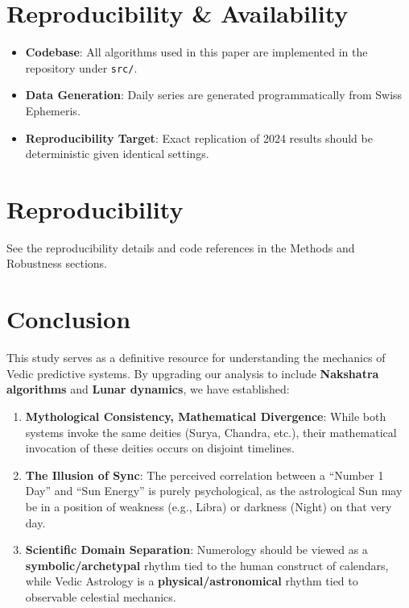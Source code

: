 \documentclass[
  american,
  11pt,
  oneside,
  openany]{article}
\providecommand{\tightlist}{%
  \setlength{\itemsep}{0pt}\setlength{\parskip}{0pt}}
\begin{document}
\section{Reproducibility \&
Availability}\label{reproducibility-availability}

\begin{itemize}
\tightlist
\item
  \textbf{Codebase}: All algorithms used in this paper are implemented
  in the repository under \texttt{src/}.
\item
  \textbf{Data Generation}: Daily series are generated programmatically
  from Swiss Ephemeris.
\item
  \textbf{Reproducibility Target}: Exact replication of 2024 results
  should be deterministic given identical settings.
\end{itemize}

\FloatBarrier

\section{Reproducibility}\label{reproducibility}

See the reproducibility details and code references in the Methods and
Robustness sections.

\section{Conclusion}\label{conclusion}

This study serves as a definitive resource for understanding the
mechanics of Vedic predictive systems. By upgrading our analysis to
include \textbf{Nakshatra algorithms} and \textbf{Lunar dynamics}, we
have established:

\begin{enumerate}
\def\labelenumi{\arabic{enumi}.}
\tightlist
\item
  \textbf{Mythological Consistency, Mathematical Divergence}: While both
  systems invoke the same deities (Surya, Chandra, etc.), their
  mathematical invocation of these deities occurs on disjoint timelines.
\item
  \textbf{The Illusion of Sync}: The perceived correlation between a
  ``Number 1 Day'' and ``Sun Energy'' is purely psychological, as the
  astrological Sun may be in a position of weakness (e.g., Libra) or
  darkness (Night) on that very day.
\item
  \textbf{Scientific Domain Separation}: Numerology should be viewed as
  a \textbf{symbolic/archetypal} rhythm tied to the human construct of
  calendars, while Vedic Astrology is a \textbf{physical/astronomical}
  rhythm tied to observable celestial mechanics.
\end{enumerate}
\end{document}

